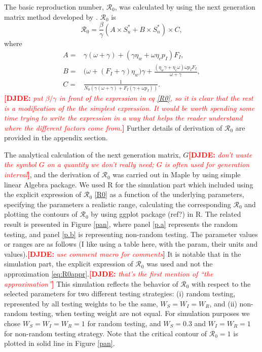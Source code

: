 \documentclass[12pt]{article}
\newcommand{\Rnum}{\mathcal{R}_0}
\newcommand{\comment}{\showcomment}
\newcommand{\showcomment}[3]{\textcolor{#1}{\textbf{[#2: }\textsl{#3}\textbf{]}}}
\newcommand{\david}[1]{\comment{red}{DJDE}{#1}}
\theoremstyle{definition} %
\begin{document}
The basic reproduction number, $\Rnum$, was calculated by using the next generation matrix method developed by \cite{van2002reproduction}. $\Rnum$ is
\begin{equation}
\label{R0}
\Rnum= \frac{\beta}{\gamma} (A \times S_u^* + B \times S_n^*) \times C, 
\end{equation}
where
\begin{equation}
\begin{aligned}
\label{eq:abc}
A=& \gamma(\omega+\gamma) + (\gamma \eta_w + \omega \eta_c p_I) F_I, \\
B=& \big(\omega+(F_I+\gamma)\eta_w\big) \gamma+\frac{(\eta_w \gamma+ \eta_c\omega) \omega p_I F_I }{\omega+\gamma}, \\ 
C=& \frac{1}{N_0 (\gamma(\omega+\gamma)+F_I(\gamma+\omega p_I))}.
\end{aligned}
\end{equation}
\david{put $\beta/\gamma$ in front of the expression in eq \eqref{R0}, so it is clear that the rest is a modification of the the simplest expression.  It would be worth spending some time trying to write the expression in a way that helps the reader understand where the different factors come from.}
Further details of derivation of $\Rnum$ are provided in the appendix section.
 
The analytical calculation of the next generation matrix, $G$\david{don't waste the symbol $G$ on a quantity we don't really need; $G$ is often used for generation interval}, and the derivation of $\Rnum$ was carried out in Maple \citep{maple14} by using simple linear Algebra package. 
  We used R \citep{r} for the simulation part which included using the explicit expression of $\Rnum$ \ref{R0} as a function of the underlying parameters, specifying the parameters a realistic range, calculating the corresponding $\Rnum$ and plotting the contours of $\Rnum$ by using ggplot package (ref?) in R. The related result is presented in Figure \ref{pan}, where  panel \eqref{p.a} represents the random testing, and panel \eqref{p.b} is representing non-random testing. The parameter values or ranges are as follows (I like using a table here, with the param, their units and values).\david{use comment macro for comments} It is notable that in the simulation part, the explicit expression of $\Rnum$ was used and not the approximation \eqref{eq:R0appr}.\david{that's the first mention of ``the approximation''} This simulation reflects the behavior of $\Rnum$ with respect to the selected parameters for two different testing strategies: (i) random testing, represented by all testing weights to be the same, $W_S=W_I=W_R$, and (ii) non-random testing, when testing weight are not equal. For simulation purposes we chose $W_S=W_I=W_R=1$ for random testing, and $W_S=0.3$ and $W_I=W_R=1$ for non-random testing strategy. Note that the critical contour of $\Rnum=1$ is plotted in solid line in Figure \ref{pan}. 
\end{document}
